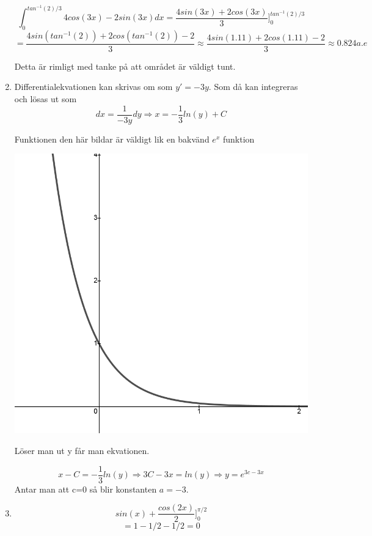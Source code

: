 \documentclass[a4paper,12pt]{article}
\begin{document}
\begin{enumerate}
    $$\int_0^{tan^{-1}(2)/3}4cos(3x)-2sin(3x)dx=\frac{4sin(3x)+2cos(3x)}{3}]^{tan^{-1}(2)/3}_0$$
    $$=\frac{4sin(tan^{-1}(2))+2cos(tan^{-1}(2))-2}{3}\approx \frac{4sin(1.11)+2cos(1.11)-2}{3}\approx 0.824 a.e$$

    Detta är rimligt med tanke på att området är väldigt tunt.

    \item Differentialekvationen kan skrivas om som $y'=-3y$. Som då kan integreras och lösas ut som
    $${dx}=\frac{1}{-3y}dy\Rightarrow x=-\frac{1}{3}ln(y)+C$$

    Funktionen den här bildar är väldigt lik en bakvänd $e^x$ funktion
    \begin{center}
        \includegraphics[scale=0.4]{Figur 5.png}
    \end{center}

    Löser man ut y får man ekvationen.

    $$x-C=-\frac{1}{3}ln(y)\Rightarrow 3C-3x=ln(y)\Rightarrow y=e^{3c-3x}$$
    Antar man att c=0 så blir konstanten $a=-3$.

    \item 

    $$sin(x) + \frac{cos(2x)}{2}]_0^{\pi/2}$$
    $$=1-1/2-1/2=0$$


\end{enumerate}
\end{document}
